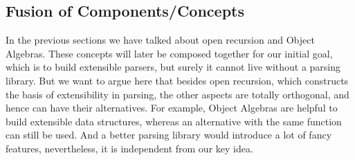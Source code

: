 \subsection{Fusion of Components/Concepts}

In the previous sections we have talked about open recursion and Object Algebras. These concepts will later be composed together for our
initial goal, which is to build extensible parsers, but surely it cannot live without a parsing library. But we want to argue here that besides
open recursion, which constructs the basis of extensibility in parsing, the other aspects are totally orthogonal, and hence can have their alternatives.
For example, Object Algebras are helpful to build extensible data structures, whereas an alternative with the same function can still be used. And a better
parsing library would introduce a lot of fancy features, nevertheless, it is independent from our key idea.

